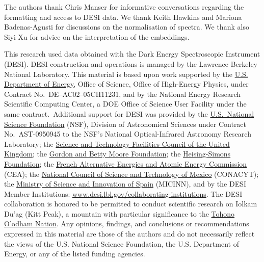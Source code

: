 \documentclass[fleqn,usenatbib]{mnras}
\begin{document}
The authors thank Chris Manser for informative conversations regarding the formatting and access to DESI data.
We thank Keith Hawkins and Mariona Badenas-Agusti for discussions on the normalisation of spectra.
We thank also Siyi Xu for advice on the interpretation of the embeddings.

This research used data obtained with the Dark Energy Spectroscopic Instrument (DESI).
DESI construction and operations is managed by the Lawrence Berkeley National Laboratory.
This material is based upon work supported by the \href{https://www.energy.gov/}{U.S. Department of Energy}, Office of Science, Office of High-Energy Physics, under Contract No.\ DE–AC02–05CH11231, and by the National Energy Research Scientific Computing Center, a DOE Office of Science User Facility under the same contract.\
Additional support for DESI was provided by the \href{https://www.nsf.gov/}{U.S.\ National Science Foundation} (NSF), Division of Astronomical Sciences under Contract No.\ AST-0950945 to the NSF’s National Optical-Infrared Astronomy Research Laboratory;
the \href{https://stfc.ukri.org/}{Science and Technology Facilities Council of the United Kingdom};
the \href{https://www.moore.org/}{Gordon and Betty Moore Foundation};
the \href{https://www.hsfoundation.org/}{Heising-Simons Foundation};
the \href{http://www.cea.fr/}{French Alternative Energies and Atomic Energy Commission} (CEA);
the \href{https://www.conacyt.gob.mx/}{National Council of Science and Technology of Mexico} (CONACYT);
the \href{http://www.mineco.gob.es/}{Ministry of Science and Innovation of Spain} (MICINN), and by the DESI Member Institutions: \url{www.desi.lbl.gov/collaborating-institutions}.
The DESI collaboration is honored to be permitted to conduct scientific research on Iolkam Du’ag (Kitt Peak), a mountain with particular significance to the \href{http://www.tonation-nsn.gov/}{Tohono O’odham Nation}.
Any opinions, findings, and conclusions or recommendations expressed in this material are those of the authors and do not necessarily reflect the views of the U.S. National Science Foundation, the U.S. Department of Energy, or any of the listed funding agencies.
\end{document}
